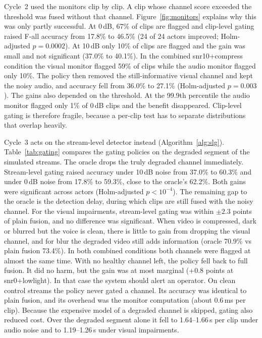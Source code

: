 Cycle~2 used the monitors clip by clip. A clip whose channel score exceeded the threshold was fused without that channel. Figure~\ref{fig:monitors} explains why this was only partly successful. At 0\,dB, 67\% of clips are flagged and clip-level gating raised F-all accuracy from 17.8\% to 46.5\% (24 of 24 actors improved; Holm-adjusted $p=0.0002$). At 10\,dB only 10\% of clips are flagged and the gain was small and not significant (37.0\% to 40.1\%). In the combined snr10+compress condition the visual monitor flagged 59\% of clips while the audio monitor flagged only 10\%. The policy then removed the still-informative visual channel and kept the noisy audio, and accuracy fell from 36.0\% to 27.1\% (Holm-adjusted $p=0.003$). The gains also depended on the threshold. At the 99.9th percentile the audio monitor flagged only 1\% of 0\,dB clips and the benefit disappeared. Clip-level gating is therefore fragile, because a per-clip test has to separate distributions that overlap heavily.

Cycle~3 acts on the stream-level detector instead (Algorithm~\ref{alg:slg}). Table~\ref{tab:gating} compares the gating policies on the degraded segment of the simulated streams. The oracle drops the truly degraded channel immediately. Stream-level gating raised accuracy under 10\,dB noise from 37.0\% to 60.3\% and under 0\,dB noise from 17.8\% to 59.3\%, close to the oracle's 62.2\%. Both gains were significant across actors (Holm-adjusted $p<10^{-4}$). The remaining gap to the oracle is the detection delay, during which clips are still fused with the noisy channel. For the visual impairments, stream-level gating was within $\pm2.3$ points of plain fusion, and no difference was significant. When video is compressed, dark or blurred but the voice is clean, there is little to gain from dropping the visual channel, and for blur the degraded video still adds information (oracle 70.9\% vs plain fusion 73.4\%). In both combined conditions both channels were flagged at almost the same time. With no healthy channel left, the policy fell back to full fusion. It did no harm, but the gain was at most marginal (+0.8 points at snr0+lowlight). In that case the system should alert an operator. On clean control streams the policy never gated a channel. Its accuracy was identical to plain fusion, and its overhead was the monitor computation (about 0.6\,ms per clip). Because the expensive model of a degraded channel is skipped, gating also reduced cost. Over the degraded segment alone it fell to 1.64--1.66\,s per clip under audio noise and to 1.19--1.26\,s under visual impairments.

